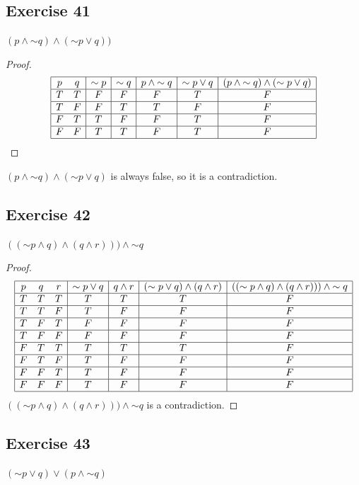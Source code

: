 \documentclass[14pt]{extarticle}
\begin{document}
\subsection{Exercise 41}
$(p \wedge {\sim q}) \wedge ({\sim p} \vee q))$

\begin{proof}
$$
\begin{array}{|cc|c|c|c|c|c|}
\hline
p & q & {\sim p} & {\sim q} & p \wedge {\sim q} & {\sim p} \vee q &
(p \wedge {\sim q}) \wedge ({\sim p} \vee q) \\
\hline
T & T & F & F & F & T & F  \\
\hline
T & F & F & T & T & F & F  \\
\hline
F & T & T & F & F & T & F  \\
\hline
F & F & T & T & F & T & F  \\
\hline
\end{array}
$$
\end{proof}
$(p \wedge {\sim q}) \wedge ({\sim p} \vee q)$ is always false, so it is a
contradiction.


\subsection{Exercise 42}
$(({\sim p} \wedge q) \wedge (q \wedge r))) \wedge {\sim q}$

\begin{proof}
$$
\begin{array}{|ccc|c|c|c|c|}
\hline
p & q & r & {\sim p} \vee q & q \wedge r & ({\sim p} \vee q) \wedge (q \wedge
r)& (({\sim p} \wedge q) \wedge (q \wedge r))) \wedge {\sim q} \\
\hline
T & T & T & T & T & T & F \\
\hline
T & T & F & T & F & F & F \\
\hline
T & F & T & F & F & F & F \\
\hline
T & F & F & F & F & F & F \\
\hline
F & T & T & T & T & T & F \\
\hline
F & T & F & T & F & F & F \\
\hline
F & F & T & T & F & F & F \\
\hline
F & F & F & T & F & F & F \\
\hline
\end{array}
$$
$(({\sim p} \wedge q) \wedge (q \wedge r))) \wedge {\sim q}$ is a contradiction.
\end{proof}

\subsection{Exercise 43}
$({\sim p} \vee q) \vee (p \wedge {\sim q})$
\end{document}
